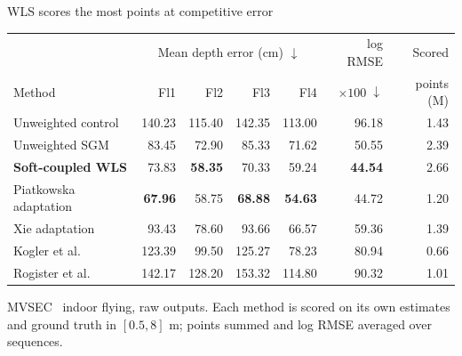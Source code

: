 \begin{frame}{WLS scores the most points at competitive error}
\renewcommand{\arraystretch}{1.05}
\begin{center}\footnotesize\begin{tabular}{lrrrrrr}
\toprule & \multicolumn{4}{c}{Mean depth error (cm) $\downarrow$}&log RMSE&Scored\\
Method & Fl1&Fl2&Fl3&Fl4&$\times100\;\downarrow$&points (M)\\\midrule
Unweighted control&140.23&115.40&142.35&113.00&96.18&1.43\\
Unweighted SGM~\cite{Hirschmueller2008}&83.45&72.90&85.33&71.62&50.55&2.39\\
\textbf{Soft-coupled WLS}&73.83&\textbf{58.35}&70.33&59.24&\textbf{44.54}&2.66\\
\midrule
Piatkowska adaptation~\cite{piatkowska2017}&\textbf{67.96}&58.75&\textbf{68.88}&\textbf{54.63}&44.72&1.20\\
Xie adaptation~\cite{Xie2018}&93.43&78.60&93.66&66.57&59.36&1.39\\
Kogler et al.~\cite{kogler2011}&123.39&99.50&125.27&78.23&80.94&0.66\\
Rogister et al.~\cite{Rogister2012}&142.17&128.20&153.32&114.80&90.32&1.01\\\bottomrule
\end{tabular}\end{center}\vspace*{-2mm}
\scriptsize MVSEC~\cite{MVSEC2018} indoor flying, raw outputs. Each method is scored on its own estimates and ground truth in $[0.5,8]$ m; points summed and log RMSE averaged over sequences.

\end{frame}
